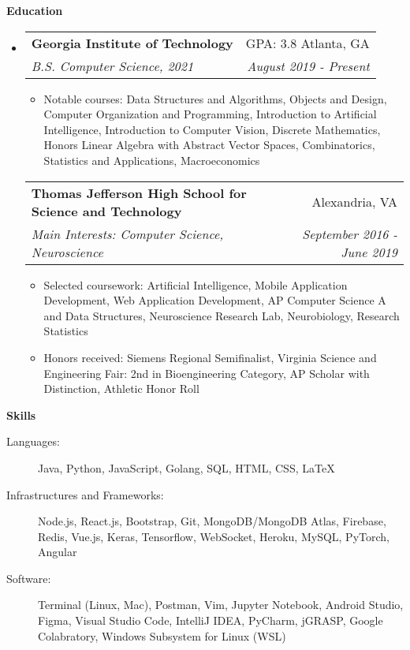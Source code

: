 \documentclass[letterpaper,11pt]{article}
\makeatletter
\newcommand{\resitem}[1]{\item #1 \vspace{-2pt}}
\newcommand{\resheading}[1]{{\large \colorbox{mygrey}{\begin{minipage}{\textwidth}{\textbf{#1 \vphantom{p\^{E}}}}\end{minipage}}}}
\newcommand{\ressubheading}[4]{
\begin{tabular*}{7.0in}{l@{\extracolsep{\fill}}r}
		\textbf{#1} & #2 \\
		\textit{#3} & \textit{#4} \\
\end{tabular*}\vspace{-6pt}}
\makeatother
\begin{document}
\resheading{Education}
\begin{itemize}
\item[]  %
    \ressubheading{Georgia Institute of Technology}{GPA: 3.8 \hspace{1em} Atlanta, GA}{B.S. Computer Science, 2021}{August 2019 - Present}
	\begin{itemize}
	    \resitem{Notable courses: Data Structures and Algorithms, Objects and Design, Computer Organization and Programming, Introduction to Artificial Intelligence, Introduction to Computer Vision, Discrete Mathematics, Honors Linear Algebra with Abstract Vector Spaces, Combinatorics, Statistics and Applications, Macroeconomics}
	\end{itemize}
	\ressubheading{Thomas Jefferson High School for Science and Technology}{Alexandria, VA}{Main Interests: Computer Science, Neuroscience}{September 2016 - June 2019}
	\begin{itemize}
        \resitem{Selected coursework: Artificial Intelligence, Mobile Application Development, Web Application Development, AP Computer Science A and Data Structures, Neuroscience Research Lab, Neurobiology, Research Statistics}
        \resitem{Honors received: Siemens Regional Semifinalist, Virginia Science and Engineering Fair: 2nd in Bioengineering Category, AP Scholar with Distinction, Athletic Honor Roll}
	\end{itemize}
\end{itemize}

\resheading{Skills}

\begin{description}
\item[Languages:] Java, Python, JavaScript, Golang, SQL, HTML, CSS, LaTeX %
\item[Infrastructures and Frameworks:] Node.js, React.js, Bootstrap, Git, MongoDB/MongoDB Atlas, Firebase, Redis, Vue.js, Keras, Tensorflow, WebSocket, Heroku, MySQL, PyTorch, Angular
\item[Software:] Terminal (Linux, Mac), Postman, Vim, Jupyter Notebook, Android Studio, Figma, Visual Studio Code, IntelliJ IDEA, PyCharm, jGRASP, Google Colabratory, Windows Subsystem for Linux (WSL)
\end{description}
\end{document}
